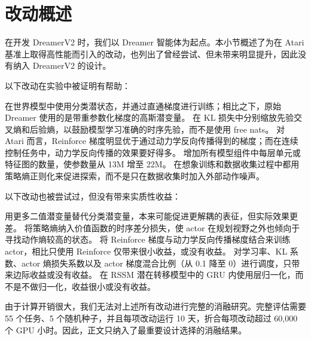 \section{改动概述}
\label{sec:modifications}

在开发 DreamerV2 时，我们以 Dreamer 智能体\citep{hafner2019dreamer}为起点。本小节概述了为在 Atari 基准上取得高性能而引入的改动，也列出了曾经尝试、但未带来明显提升，因此没有纳入 DreamerV2 的设计。

以下改动在实验中被证明有帮助：

\begin{itemize}
 在世界模型中使用分类潜状态，并通过直通梯度进行训练；相比之下，原始 Dreamer 使用的是带重参数化梯度的高斯潜变量。
 在 KL 损失中分别缩放先验交叉熵和后验熵，以鼓励模型学习准确的时序先验，而不是使用 free nats。
 对 Atari 而言，Reinforce 梯度明显优于通过动力学反向传播得到的梯度；而在连续控制任务中，动力学反向传播的效果要好得多。
 增加所有模型组件中每层单元或特征图的数量，使参数量从 13M 增至 22M。
 在想象训练和数据收集过程中都用策略熵正则化来促进探索，而不是只在数据收集时加入外部动作噪声。
\end{itemize}

以下改动也被尝试过，但没有带来实质性收益：

\begin{itemize}
 用更多二值潜变量替代分类潜变量，本来可能促进更解耦的表征，但实际效果更差。
 将策略熵纳入价值函数的时序差分损失，使 actor 在规划视野之外也倾向于寻找动作熵较高的状态。
 将 Reinforce 梯度与动力学反向传播梯度结合来训练 actor，相比只使用 Reinforce 仅带来很小收益，或没有收益。
 对学习率、KL 系数、actor 熵损失系数以及 actor 梯度混合比例（从 0.1 降至 0）进行调度，只带来边际收益或没有收益。
 在 RSSM 潜在转移模型中的 GRU 内使用层归一化，而不是不做归一化，收益很小或没有收益。
\end{itemize}

由于计算开销很大，我们无法对上述所有改动进行完整的消融研究。完整评估需要 55 个任务、5 个随机种子，并且每项改动运行 10 天，折合每项改动超过 60,000 个 GPU 小时。因此，正文只纳入了最重要设计选择的消融结果。

